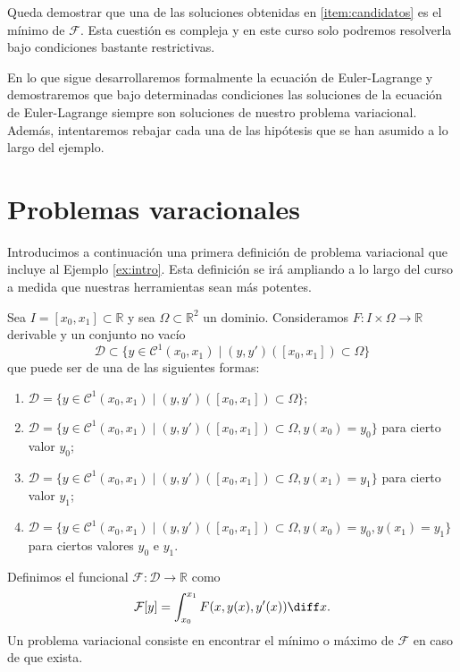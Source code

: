 \documentclass{article}
\begin{document}
Queda demostrar que una de las soluciones obtenidas en \ref{item:candidatos} es el mínimo de
$\mathcal{F}$. Esta cuestión es compleja y en este curso solo podremos resolverla bajo condiciones
bastante restrictivas.

En lo que sigue desarrollaremos formalmente la ecuación de Euler-Lagrange y demostraremos que bajo
determinadas condiciones las soluciones de la ecuación de Euler-Lagrange siempre son soluciones de
nuestro problema variacional. Además, intentaremos rebajar cada una de las hipótesis que se han
asumido a lo largo del ejemplo.
  
\section{Problemas varacionales} \label{sec:pv}

Introducimos a continuación una primera definición de problema variacional que incluye al Ejemplo
\ref{ex:intro}. Esta definición se irá ampliando a lo largo del curso a medida que nuestras
herramientas sean más potentes.

\begin{definition} \label{def:pv} Sea $I = [x_0, x_1] \subset \mathbb{R}$ y sea
  $\Omega \subset \mathbb{R}^2$ un dominio. Consideramos $F\colon I \times \Omega \to \mathbb{R}$
  derivable y un conjunto no vacío
  \[\mathcal{D} \subset \{y \in \mathcal{C}^1(x_0, x_1)\mid (y, y')([x_0, x_1]) \subset \Omega\}\]
  que puede ser de una de las siguientes formas:
  \begin{enumerate}
  \item $\mathcal{D} = \{y \in \mathcal{C}^1(x_0, x_1)\mid (y, y')([x_0, x_1]) \subset \Omega\};$
  \item
    $\mathcal{D} = \{y \in \mathcal{C}^1(x_0, x_1)\mid (y, y')([x_0, x_1]) \subset \Omega, y(x_0) =
    y_0\}$ para cierto valor $y_0$;
  \item
    $\mathcal{D} = \{y \in \mathcal{C}^1(x_0, x_1)\mid (y, y')([x_0, x_1]) \subset \Omega, y(x_1) =
    y_1\}$ para cierto valor $y_1$;
  \item
    $\mathcal{D} = \{y \in \mathcal{C}^1(x_0, x_1)\mid (y, y')([x_0, x_1]) \subset \Omega, y(x_0) =
    y_0, y(x_1) = y_1\}$ para ciertos valores $y_0$ e $y_1$.
  \end{enumerate}

  Definimos el funcional $\mathcal{F}\colon \mathcal{D} \to \mathbb{R}$ como
  \[\mathcal{F}[y] = \int_{x_0}^{x_1} F(x, y(x), y'(x)) \diff x.\]
  Un problema variacional consiste en encontrar el mínimo o máximo de $\mathcal{F}$ en caso de que
  exista.
\end{definition}
\end{document}
